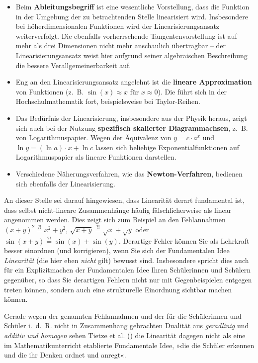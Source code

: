 \documentclass[
]{scrbook}
\providecommand{\tightlist}{%
  \setlength{\itemsep}{0pt}\setlength{\parskip}{0pt}}
\theoremstyle{definition}
\theoremstyle{definition}
\theoremstyle{definition}
\theoremstyle{definition}
\theoremstyle{remark}
\begin{document}
\begin{itemize}
\tightlist
\item
  Beim \textbf{Ableitungsbegriff} ist eine wesentliche Vorstellung, dass die Funktion in der Umgebung der zu betrachtenden Stelle linearisiert wird. Insbesondere bei höherdimensionalen Funktionen wird der Linearisierungsansatz weiterverfolgt. Die ebenfalls vorherrschende Tangentenvorstellung ist auf mehr als drei Dimensionen nicht mehr anschaulich übertragbar -- der Linearisierungsansatz weist hier aufgrund seiner algebraischen Beschreibung die bessere Verallgemeinerbarkeit auf.
\item
  Eng an den Linearisierungsansatz angelehnt ist die \textbf{lineare Approximation} von Funktionen (z.~B. \(\sin(x)\approx x\) für \(x\approx 0\)). Die führt sich in der Hochschulmathematik fort, beispielsweise bei Taylor-Reihen.
\item
  Das Bedürfnis der Linearisierung, insbesondere aus der Physik heraus, zeigt sich auch bei der Nutzung \textbf{spezifisch skalierter Diagrammachsen}, z.~B. von Logarithmuspapier. Wegen der Äquivalenz von \(y = c\cdot a^x\) und \(\ln y = (\ln a )\cdot x + \ln c\) lassen sich beliebige Exponentialfunktionen auf Logarithmuspapier als lineare Funktionen darstellen.
\item
  Verschiedene Näherungsverfahren, wie das \textbf{Newton-Verfahren}, bedienen sich ebenfalls der Linearisierung.
\end{itemize}

An dieser Stelle sei darauf hingewiesen, dass Linearität derart fundamental ist, dass selbst nicht-lineare Zusammenhänge häufig fälschlicherweise als linear angenommen werden. Dies zeigt sich zum Beispiel an den Fehlannahmen \((x+y)^2 \overset{?!}{=} x^2+y^2\), \(\sqrt{x+y} \overset{?!}{=} \sqrt{x}+\sqrt{y}\) oder \(\sin(x+y) \overset{?!}{=} \sin(x)+\sin(y)\). Derartige Fehler können Sie als Lehrkraft besser einordnen (und korrigieren), wenn Sie sich der Fundamentalen Idee \emph{Linearität} (die hier eben \emph{nicht} gilt) bewusst sind. Insbesondere spricht dies auch für ein Explizitmachen der Fundamentalen Idee Ihren Schülerinnen und Schülern gegenüber, so dass Sie derartigen Fehlern nicht nur mit Gegenbeispielen entgegen treten können, sondern auch eine strukturelle Einordnung sichtbar machen können.

Gerade wegen der genannten Fehlannahmen und der für die Schülerinnen und Schüler i.~d.~R. nicht in Zusammenhang gebrachten Dualität aus \emph{geradlinig} und \emph{additiv und homogen} sehen Tietze et al. () die Linearität dagegen nicht als eine im Mathematikunterricht etablierte Fundamentale Idee, »die die Schüler erkennen und die ihr Denken ordnet und anregt«.
\end{document}
